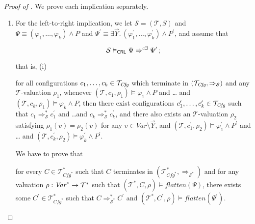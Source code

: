 \begin{proof}[Proof of ]
We prove each implication separately.
\begin{enumerate}
    \item For the left-to-right implication, we
    let $\mathcal{S} = (\mathcal{T}, S)$
    and $\Psi \equiv (\varphi_1,\ldots,\varphi_k) \land P$
    and $\Psi^\prime \equiv \exists \vec{Y}.\, (\varphi_1^\prime,\ldots,\varphi_k^\prime) \land P^\prime$,
    and assume that
    \begin{proofenv}
        \begin{equation*}
            \mathcal{S} \vDash_{\mathsf{CRL}} \Psi \Rightarrow^{c\exists} \Psi^\prime \, ;
        \end{equation*}
    \end{proofenv}
    that is, (i)
    \begin{proofenv}
        for all configurations $c_1,\ldots,c_k \in \mathcal{T}_{\mathit{Cfg}}$
        which terminate in $(\mathcal{T}_{\mathit{Cfg}}, \Rightarrow_{\mathcal{S}})$
        and any $\mathcal{T}$-valuation $\rho_1$,
        whenever $(\mathcal{T}, c_1,\rho_1) \vDash \varphi_1 \land P$ and \ldots
        and $(\mathcal{T}, c_k,\rho_1) \vDash \varphi_k \land P$,
        then there exist configurations $c_1^\prime,\ldots,c_k^\prime \in \mathcal{T}_{\mathit{Cfg}}$
        such that $c_1 \Rightarrow^{*}_{\mathcal{S}} c_1^\prime$
        and \ldots and $c_k \Rightarrow^{*}_{\mathcal{S}} c_k^\prime$,
        and there also exists an $\mathcal{T}$-valuation $\rho_2$
        satisfying $\rho_1(v) = \rho_2(v)$ for any $v \in \mathit{Var} \setminus \vec{Y}$,
        and
        $(\mathcal{T}, c_1^\prime,\rho_2) \vDash \varphi^\prime_1 \land P^\prime$ and \ldots
        and $(\mathcal{T}, c_k^\prime, \rho_2) \vDash \varphi^\prime_k \land P^\prime$.
    \end{proofenv}
    We have to prove that
    \begin{proofenv}
    for every $C \in \mathcal{T}^*_{\mathit{Cfg}^*}$
    such that $C$ terminates in $(\mathcal{T}^*_{\mathit{Cfg}^*}, \Rightarrow_{\mathcal{S}^*})$
    and for any valuation $\rho : \mathit{Var}^* \to \mathcal{T}^*$
    such that $(\mathcal{T}^*, C, \rho) \vDash \mathit{flatten}(\Psi)$,
    there exists some $C^\prime \in \mathcal{T}^*_{\mathit{Cfg}^*}$
    such that
    $C \Rightarrow^{*}_{\mathcal{S}^*} C^\prime$
    and $(\mathcal{T}^*, C^\prime, \rho) \vDash \mathit{flatten}(\Psi^\prime)$.
    \end{proofenv}

\end{enumerate}
\end{proof}
